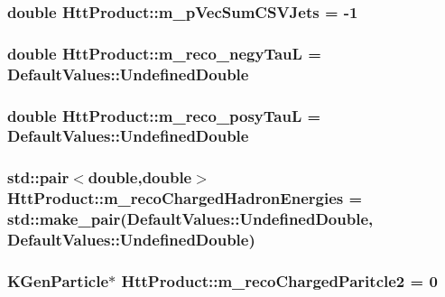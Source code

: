 \label{classHttProduct_aff3f5f7a0d777506d01369813d160925}
\hypertarget{classHttProduct_a44276b9923909f4eca106fcec1968b30}{
\subsubsection[{m\_\-pVecSumCSVJets}]{\setlength{\rightskip}{0pt plus 5cm}double {\bf HttProduct::m\_\-pVecSumCSVJets} = -\/1}}
\label{classHttProduct_a44276b9923909f4eca106fcec1968b30}
\hypertarget{classHttProduct_ab108952b461b79071c8dc6d25fb901b8}{
\subsubsection[{m\_\-reco\_\-negyTauL}]{\setlength{\rightskip}{0pt plus 5cm}double {\bf HttProduct::m\_\-reco\_\-negyTauL} = DefaultValues::UndefinedDouble}}
\label{classHttProduct_ab108952b461b79071c8dc6d25fb901b8}
\hypertarget{classHttProduct_a8152fe5094df12ffcce5647c008f9f42}{
\subsubsection[{m\_\-reco\_\-posyTauL}]{\setlength{\rightskip}{0pt plus 5cm}double {\bf HttProduct::m\_\-reco\_\-posyTauL} = DefaultValues::UndefinedDouble}}
\label{classHttProduct_a8152fe5094df12ffcce5647c008f9f42}
\hypertarget{classHttProduct_a00b53081f6bd3ad818e9108569389e43}{
\subsubsection[{m\_\-recoChargedHadronEnergies}]{\setlength{\rightskip}{0pt plus 5cm}std::pair$<$double,double$>$ {\bf HttProduct::m\_\-recoChargedHadronEnergies} = std::make\_\-pair(DefaultValues::UndefinedDouble, DefaultValues::UndefinedDouble)}}
\label{classHttProduct_a00b53081f6bd3ad818e9108569389e43}
\hypertarget{classHttProduct_ade299bec9d6dd15b181cd562ec28cd3b}{
\subsubsection[{m\_\-recoChargedParitcle2}]{\setlength{\rightskip}{0pt plus 5cm}KGenParticle$\ast$ {\bf HttProduct::m\_\-recoChargedParitcle2} = 0}}
